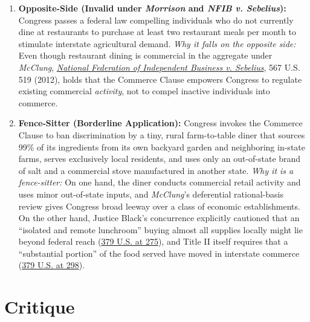 \documentclass[12pt]{article}
\begin{document}
\begin{enumerate}
\item \textbf{Opposite-Side (Invalid under \textit{Morrison} and \textit{NFIB v. Sebelius}):} Congress passes a federal law compelling individuals who do not currently dine at restaurants to purchase at least two restaurant meals per month to stimulate interstate agricultural demand. \textit{Why it falls on the opposite side:} Even though restaurant dining is commercial in the aggregate under \textit{McClung}, \href{https://supreme.justia.com/cases/federal/us/567/519/}{\textit{National Federation of Independent Business v. Sebelius}}, 567 U.S. 519 (2012), holds that the Commerce Clause empowers Congress to regulate existing commercial \textit{activity}, not to compel inactive individuals into commerce.

\item \textbf{Fence-Sitter (Borderline Application):} Congress invokes the Commerce Clause to ban discrimination by a tiny, rural farm-to-table diner that sources 99\% of its ingredients from its own backyard garden and neighboring in-state farms, serves exclusively local residents, and uses only an out-of-state brand of salt and a commercial stove manufactured in another state. \textit{Why it is a fence-sitter:} On one hand, the diner conducts commercial retail activity and uses minor out-of-state inputs, and \textit{McClung}'s deferential rational-basis review gives Congress broad leeway over a class of economic establishments. On the other hand, Justice Black's concurrence explicitly cautioned that an ``isolated and remote lunchroom'' buying almost all supplies locally might lie beyond federal reach (\href{https://supreme.justia.com/cases/federal/us/379/241/}{379 U.S. at 275}), and Title II itself requires that a ``substantial portion'' of the food served have moved in interstate commerce (\href{https://supreme.justia.com/cases/federal/us/379/294/}{379 U.S. at 298}).
\end{enumerate}

\section{Critique}
\end{document}
